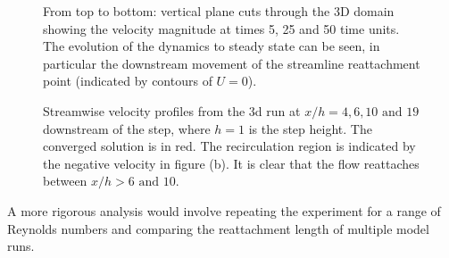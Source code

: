 \begin{figure}
\centering
{}
\caption{From top to bottom: vertical plane cuts through the 3D domain showing
the velocity magnitude at times 5, 25 and 50 time units.
The evolution of the dynamics to steady state can be seen, in particular the downstream movement
of the streamline reattachment point (indicated by contours of $U=0$).}
\label{Fig:velo-magnitude-3d}
\end{figure}

\begin{figure}
\centering
{}
\caption{Streamwise velocity profiles from the 3d run at $x/h=4, 6, 10 \text{ and } 19$
downstream of the step, where $h=1$ is the step height. The converged solution is in red.
The recirculation region is indicated by the negative velocity in figure (b).
It is clear that the flow reattaches between $x/h>6 \text{ and } 10$.}
\label{Fig:UProfiles3d}
\end{figure}






A more rigorous analysis would involve
repeating the experiment for a range of Reynolds numbers and comparing the reattachment
length of multiple model runs.

